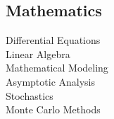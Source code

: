 \documentclass[letterpaper]{deedy-resume} %
\begin{document}
\begin{minipage}[t]{0.33\textwidth}
\sectionspace %

\subsection{Mathematics}

Differential Equations \\
Linear Algebra \\
Mathematical Modeling \\
Asymptotic Analysis \\
Stochastics \\
Monte Carlo Methods \\

\sectionspace %



\end{minipage} %
\hfill
%
%
\end{document}

